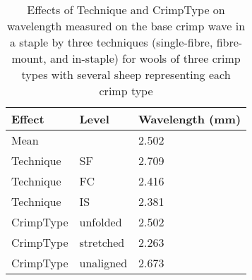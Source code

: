 %

\begin{table}[htp]
\centering
\caption{Effects of Technique and CrimpType on wavelength  measured on the base crimp wave in a staple by three techniques (single-fibre, fibre-mount, and in-staple) for wools of three crimp types with several sheep representing each crimp type}
\label{tab:fwmeans}
\vspace{0.1in}
\begin{tabular}{|p{1.8in}|p{1.0in}|p{0.9in}|} \hline
     Effect & Level & Wavelength (mm)  \\  \hline
 Mean       &       & 2.502         \\ \hline
 Technique & SF     & 2.709          \\
 Technique & FC     & 2.416     \\
 Technique & IS     & 2.381        \\ \hline
 CrimpType & unfolded &  2.502      \\
 CrimpType & stretched & 2.263      \\
 CrimpType & unaligned & 2.673      \\ \hline
\end{tabular}
\end{table}

%
